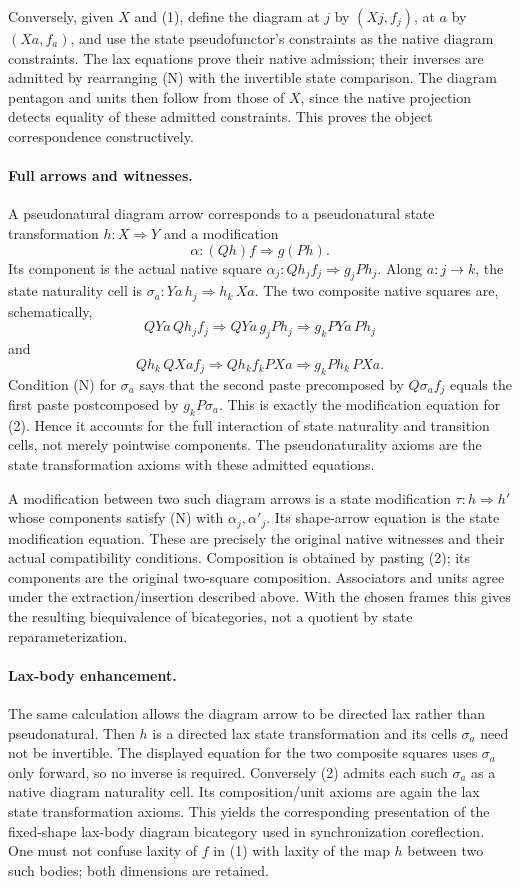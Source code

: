 \documentclass{article}
\begin{document}
Conversely, given $X$ and (1), define the diagram at $j$ by $(Xj,f_j)$, at $a$ by $(Xa,f_a)$, and use the state pseudofunctor's constraints as the native diagram constraints. The lax equations prove their native admission; their inverses are admitted by rearranging (N) with the invertible state comparison. The diagram pentagon and units then follow from those of $X$, since the native projection detects equality of these admitted constraints. This proves the object correspondence constructively.

\paragraph{Full arrows and witnesses.} A pseudonatural diagram arrow corresponds to a pseudonatural state transformation $h:X\Rightarrow Y$ and a modification
\[
 \alpha:(Qh)f\Rightarrow g(Ph).
\tag{2}
\]
Its component is the actual native square $\alpha_j:Qh_j f_j\Rightarrow g_jPh_j$. Along $a:j\to k$, the state naturality cell is
$\sigma_a:Ya\,h_j\Rightarrow h_k\,Xa$. The two composite native squares are, schematically,
\[
 QYa\,Qh_j f_j\Rightarrow QYa\,g_jPh_j
 \Rightarrow g_kPYa\,Ph_j
\]
and
\[
 Qh_k\,QXa f_j\Rightarrow Qh_k f_kPXa
 \Rightarrow g_kPh_k\,PXa.
\]
Condition (N) for $\sigma_a$ says that the second paste precomposed by $Q\sigma_a f_j$ equals the first paste postcomposed by $g_kP\sigma_a$. This is exactly the modification equation for (2). Hence it accounts for the full interaction of state naturality and transition cells, not merely pointwise components. The pseudonaturality axioms are the state transformation axioms with these admitted equations.

A modification between two such diagram arrows is a state modification $\tau:h\Rightarrow h'$ whose components satisfy (N) with $\alpha_j,\alpha'_j$. Its shape-arrow equation is the state modification equation. These are precisely the original native witnesses and their actual compatibility conditions. Composition is obtained by pasting (2); its components are the original two-square composition. Associators and units agree under the extraction/insertion described above. With the chosen frames this gives the resulting biequivalence of bicategories, not a quotient by state reparameterization.

\paragraph{Lax-body enhancement.} The same calculation allows the diagram arrow to be directed lax rather than pseudonatural. Then $h$ is a directed lax state transformation and its cells $\sigma_a$ need not be invertible. The displayed equation for the two composite squares uses $\sigma_a$ only forward, so no inverse is required. Conversely (2) admits each such $\sigma_a$ as a native diagram naturality cell. Its composition/unit axioms are again the lax state transformation axioms. This yields the corresponding presentation of the fixed-shape lax-body diagram bicategory used in synchronization coreflection. One must not confuse laxity of $f$ in (1) with laxity of the map $h$ between two such bodies; both dimensions are retained.
\end{document}
